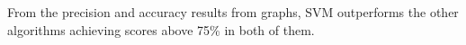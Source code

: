 From the precision and accuracy results from graphs, SVM outperforms the other algorithms achieving scores above 75\% in both of them.